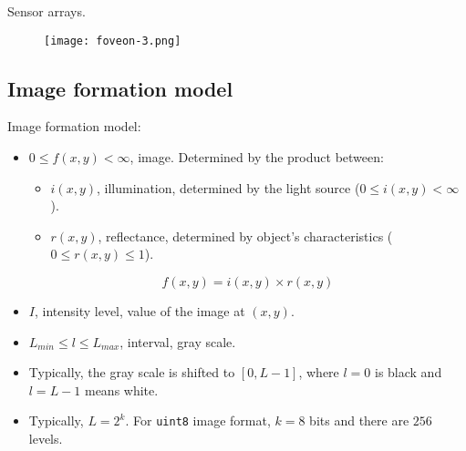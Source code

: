 
\begin{frame}
Sensor arrays.
\begin{figure}
\texttt{[image: foveon-3.png]}
\end{figure}
\end{frame}


\subsection{Image formation model}


\begin{frame}
Image formation model:
\begin{itemize}
\item $0\leq f(x,y)<\infty$, image. Determined by the product between:
\begin{itemize}
\item $i(x,y)$, illumination, determined by the light source ($0\leq i(x,y)<\infty$).
\item $r(x,y)$, reflectance, determined by object's characteristics ($0\leq r(x,y)\leq 1$).
\end{itemize}
\begin{equation}
f(x,y) = i(x,y) \times r(x,y)
\end{equation}
\end{itemize}
\end{frame}


\begin{frame}
\begin{itemize}
\item $I$, intensity level, value of the image at $(x,y)$.
\item $L_{min} \leq l \leq L_{max}$, interval, gray scale.
\item Typically, the gray scale is shifted to $[0,L-1]$, where $l=0$ is black and $l=L-1$ means white.
\item Typically, $L=2^{k}$. For \texttt{uint8} image format, $k=8$ bits and there are $256$ levels.
\end{itemize}
\end{frame}


